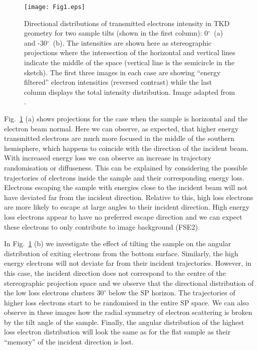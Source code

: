 \begin{figure}[ht]
\centering
\texttt{[image: Fig1.eps]} %
\caption[Directional distributions of transmitted electrons intensity in TKD.]{Directional distributions of transmitted electrons intensity in TKD geometry for two sample tilts (shown in the first column): 0$^{\circ}$~(a) and -30$^{\circ}$~(b). The intensities are shown here as stereographic projections where the intersection of the horizontal and vertical lines indicate the middle of the space (vertical line is the semicircle in the sketch). The first three images in each case are showing  ``energy filtered'' electron intensities (reversed contrast) while the last column displays the total intensity distribution. Image adapted from \cite{PascalTKD}. } 
\label{fig:SP_TKD}
\end{figure}


Fig.~\ref{fig:SP_TKD} (a) shows projections for the case when the sample is horizontal and the electron beam normal. Here we can observe, as expected, that higher energy transmitted electrons are much more focused in the middle of the southern hemisphere, which happens to coincide with the direction of the incident beam. With increased energy loss we can observe an increase in trajectory randomisation or diffuseness. This can be explained by considering the possible trajectories of electrons inside the sample and their corresponding energy loss. Electrons escaping the sample with energies close to the incident beam will not have deviated far from the incident direction. Relative to this, high loss electrons are more likely to escape at large angles to their incident direction. High energy loss electrons appear to have no preferred escape direction and we can expect these electrons to only contribute to image background (FSE2). 

In Fig.~\ref{fig:SP_TKD} (b) we investigate the effect of tilting the sample on the angular distribution of exiting electrons from the bottom surface. Similarly, the high energy electrons will not deviate far from their incident trajectories. However, in this case, the incident direction does not correspond to the centre of the stereographic projection space and we observe that the directional distribution of the low loss electrons clusters  $30^{\circ}$ below the SP horizon. The trajectories of higher loss electrons start to be randomised in the entire SP space. We can also observe in these images how the radial symmetry of electron scattering is broken by the tilt angle of the sample. Finally, the angular distribution of the highest loss electron distribution will look the same as for the flat sample as their ``memory'' of the incident direction is lost.


